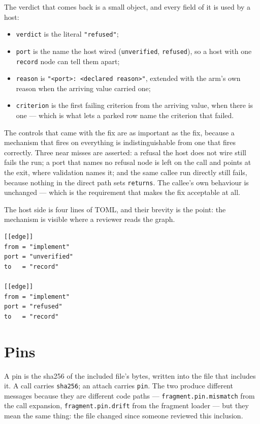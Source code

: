 The verdict that comes back is a small object, and every field of it is used by a host:

\begin{itemize}
	\item \texttt{verdict} is the literal \texttt{"refused"};
	\item \texttt{port} is the name the host wired (\texttt{unverified}, \texttt{refused}), so a host
	with one \texttt{record} node can tell them apart;
	\item \texttt{reason} is \texttt{"<port>: <declared reason>"}, extended with the arm's own reason
	when the arriving value carried one;
	\item \texttt{criterion} is the first failing criterion from the arriving value, when there is
	one --- which is what lets a parked row name the criterion that failed.
\end{itemize}

The controls that came with the fix are as important as the fix, because a mechanism that fires on
everything is indistinguishable from one that fires correctly. Three near misses are asserted: a
refusal the host does not wire still fails the run; a port that names no refusal node is left on the
call and points at the exit, where validation names it; and the same callee run directly still
fails, because nothing in the direct path sets \texttt{returns}. The callee's own behaviour is
unchanged --- which is the requirement that makes the fix acceptable at all.

The host side is four lines of TOML, and their brevity is the point: the mechanism is visible where
a reviewer reads the graph.

\begin{lstlisting}
[[edge]]
from = "implement"
port = "unverified"
to   = "record"

[[edge]]
from = "implement"
port = "refused"
to   = "record"
\end{lstlisting}

\section{Pins}

A pin is the sha256 of the included file's bytes, written into the file that includes it. A call
carries \texttt{sha256}; an attach carries \texttt{pin}. The two produce different messages because
they are different code paths --- \texttt{fragment.pin.mismatch} from the call expansion,
\texttt{fragment.pin.drift} from the fragment loader --- but they mean the same thing: the file
changed since someone reviewed this inclusion.

